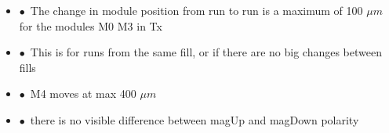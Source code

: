 \documentclass[aspectratio=1610, 12pt]{beamer}
\begin{document}
\begin{frame}%
  \begin{columns}
    \begin{column}[c]{0.9\textwidth}
      \begin{itemize}
        \item $\bullet$\, The change in module position from run to run is a maximum of 100 $\mu m$ for the modules M0 \to M3 in Tx
        \item $\bullet$\, This is for runs from the same fill, or if there are no big changes between fills
        \item $\bullet$\, M4 moves at max 400 $\mu m$
        \item $\bullet$\, there is no visible difference between magUp and magDown polarity
      \end{itemize}  
    \end{column}
  \end{columns}
\end{frame}
\end{document}
